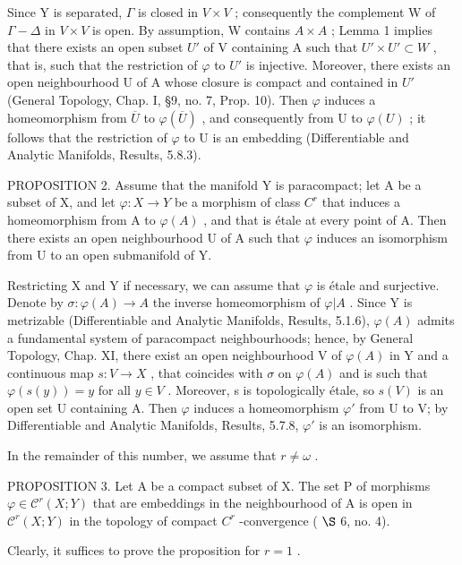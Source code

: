 Since Y is separated, \(\varGamma\) is closed in \(V \times V\) ; consequently the complement W of \(\varGamma - \varDelta\) in \(V \times V\) is open. By assumption, W contains \(A \times A\) ; Lemma 1 implies that there exists an open subset \(U'\) of V containing A such that \(U' \times U' \subset W\) , that is, such that the restriction of \(\varphi\) to \(U'\) is injective. Moreover, there exists an open neighbourhood U of A whose closure is compact and contained in \(U'\) (General Topology, Chap. I, §9, no. 7, Prop. 10). Then \(\varphi\) induces a homeomorphism from \(\overline{U}\) to \(\varphi(\overline{U})\) , and consequently from U to \(\varphi(U)\) ; it follows that the restriction of \(\varphi\) to U is an embedding (Differentiable and Analytic Manifolds, Results, 5.8.3).

PROPOSITION 2. Assume that the manifold Y is paracompact; let A be a subset of X, and let \(\varphi : X \to Y\) be a morphism of class \(C^r\) that induces a homeomorphism from A to \(\varphi(A)\) , and that is étale at every point of A. Then there exists an open neighbourhood U of A such that \(\varphi\) induces an isomorphism from U to an open submanifold of Y.

Restricting X and Y if necessary, we can assume that \(\varphi\) is étale and surjective. Denote by \(\sigma : \varphi(A) \to A\) the inverse homeomorphism of \(\varphi|A\) . Since Y is metrizable (Differentiable and Analytic Manifolds, Results, 5.1.6), \(\varphi(A)\) admits a fundamental system of paracompact neighbourhoods; hence, by General Topology, Chap. XI, there exist an open neighbourhood V of \(\varphi(A)\) in Y and a continuous map \(s : V \to X\) , that coincides with \(\sigma\) on \(\varphi(A)\) and is such that \(\varphi(s(y)) = y\) for all \(y \in V\) . Moreover, s is topologically étale, so \(s(V)\) is an open set U containing A. Then \(\varphi\) induces a homeomorphism \(\varphi'\) from U to V; by Differentiable and Analytic Manifolds, Results, 5.7.8, \(\varphi'\) is an isomorphism.

In the remainder of this number, we assume that \(r \neq \omega\) .

PROPOSITION 3. Let A be a compact subset of X. The set P of morphisms \(\varphi \in \mathcal{C}^{r}(X;Y)\) that are embeddings in the neighbourhood of A is open in \(\mathcal{C}^{r}(X;Y)\) in the topology of compact \(C^{r}\) -convergence ( \(\S\) 6, no. 4).

Clearly, it suffices to prove the proposition for \(r = 1\) .

